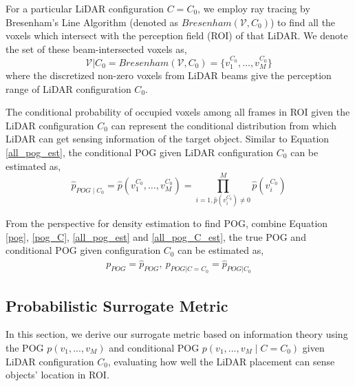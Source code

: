 \documentclass[10pt,twocolumn,letterpaper]{article}
\begin{document}
For a particular LiDAR configuration $C=C_0$, we employ ray tracing by Bresenham's Line Algorithm \cite{5388473} (denoted as $Bresenham(\mathcal{V},C_0)$) to find all the voxels which intersect with the perception field (ROI) of that LiDAR. We denote the set of these beam-intersected voxels as,
\begin{equation}
\label{bresenham_C}
\mathcal{V}| C_0 = Bresenham(\mathcal{V},C_0) = \{v_1^{C_0}, \dots, v_{M}^{C_0}\}
\end{equation}
where the discretized non-zero voxels from LiDAR beams  give the perception range of LiDAR configuration $C_0$.


The conditional probability of occupied voxels among all frames in ROI given the LiDAR configuration $C_0$ can represent the conditional distribution  from which LiDAR can  get sensing information of the target object. Similar to Equation \ref{all_pog_est},  the conditional POG given LiDAR configuration $C_0$ can be estimated as,
\begin{equation}
\label{all_pog_C_est}
\hat p_{POG \mid C_0} = \hat p(v_1^{C_0}, \dots, v_{M}^{C_0}) = \prod_{i=1, \hat p(v^{C_0}_i)\neq 0}^{M} \hat p(v^{C_0}_i)
\end{equation}

From the perspective for density estimation to find POG, combine Equation \ref{pog}, \ref{pog_C},  \ref{all_pog_est} and \ref{all_pog_C_est}, the true POG and conditional POG given  configuration $C_0$ can be estimated as,
\begin{align}
p_{POG} =  \hat p_{POG}, ~
\label{bridge_pog_C}
p_{POG |C=C_0}  = \hat p_{POG |C_0}
\end{align}



\subsection{Probabilistic Surrogate Metric}
In this section, we derive our surrogate metric based on information theory using the POG $p(v_1,...,v_M)$ and conditional POG $p(v_1,...,v_M\mid C = C_0)$ given LiDAR configuration $C_0$,  evaluating how well the LiDAR placement can sense objects' location in ROI.
\end{document}
